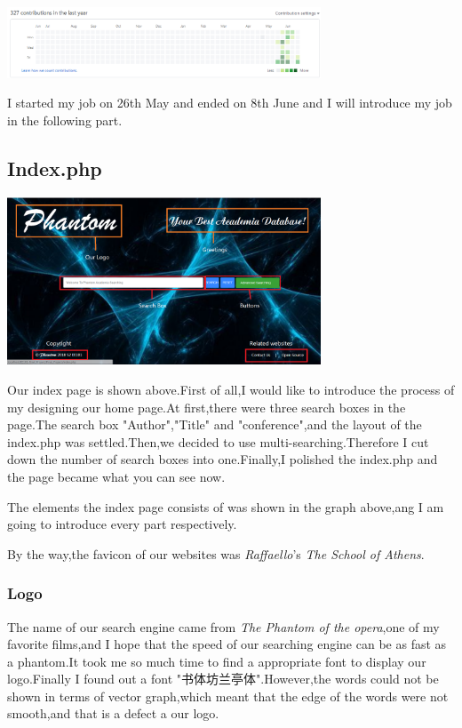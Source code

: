 \documentclass[10pt,twoside,a4paper,titlepage]{article}
\begin{document}
	\includegraphics[width=0.7\textwidth]{cyf/frequency.PNG}
	
	I started my job on 26th May and ended on 8th June and I will introduce my job in the following part.
	
	
	\subsection{Index.php}
	
	\includegraphics[width=0.7\textwidth]{cyf/index_structure.PNG}
	
	Our index page is shown above.First of all,I would like to introduce the process of my designing our home page.At first,there were three search boxes in the page.The search box "Author","Title" and "conference",and the layout of the index.php was settled.Then,we decided to use multi-searching.Therefore I cut down the number of search boxes into one.Finally,I polished the index.php and the page became what you can see now.
	
	The elements the index page consists of was shown in the graph above,ang I am going to introduce every part respectively.
	
	By the way,the favicon of our websites was \emph{Raffaello}'s \emph{The School of Athens}.
	
	\subsubsection{Logo}
	
	The name of our search engine came from \emph{The Phantom of the opera},one of my favorite films,and I hope that the speed of our searching engine can be as fast as a phantom.It took me so much time to find a appropriate font to display our logo.Finally I found out a font "书体坊兰亭体".However,the words could not be shown in terms of vector graph,which meant that the edge of the words were not smooth,and that is a defect a our logo.
	
\end{document}
